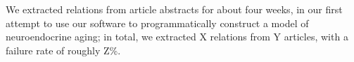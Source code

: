 We extracted relations from article abstracts for about four weeks, in our first attempt to use our software to programmatically construct
a model of neuroendocrine aging; in total, we extracted X relations from Y articles, with a failure rate of roughly Z\%.
